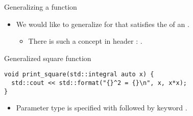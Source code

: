 \begin{frame}[t,fragile]{Generalizing a function}
\begin{itemize}
  \item We would like to generalize for  that satisfies the
         of an .
    \begin{itemize}
      \item There is such a concept in header : .
    \end{itemize}
\end{itemize}

\begin{block}{Generalized square function}
\begin{lstlisting}
void print_square(std::integral auto x) {
  std::cout << std::format("{}^2 = {}\n", x, x*x);
}
\end{lstlisting}
\end{block}

\begin{itemize}
  \item Parameter type is specified with  
        followed by keyword .


\end{itemize}

\end{frame}

